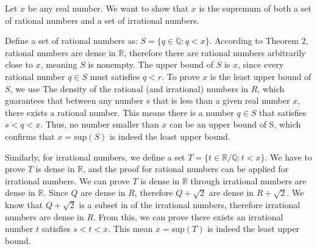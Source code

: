Let $x$ be any real number. We want to show that $x$ is the supremum of both a set of rational numbers and a set of irrational numbers.

Define a set of rational numbers as: $S=\{q \in \mathbb{Q}: q < x\}$. According to Theorem 2, rational numbers are dense in $\mathbb{R}$, therefore there are rational numbers arbitrarily close to $x$, meaning $S$ is nonempty. The upper bound of $S$ is $x$, since every rational number $q \in S$ must satisfies $q < r$. To prove $x$ is the least upper bound of $S$, we use The density of the rational (and irrational) numbers in $R$, which guarantees that between any number $s$ that is less than a given real number $x$, there exists a rational number. This means there is a number $q \in S$ that satisfies $s < q < x$. Thus, no number smaller than $x$ can be an upper bound of S, which confirms that $x = \text{sup}(S)$ is indeed the least upper bound.

Similarly, for irrational numbers, we define a set $T = \{t \in \mathbb{R} / \mathbb{Q} : t < x\}$. We have to prove $T$ is dense in $\mathbb{R}$, and the proof for rational numbers can be applied for irrational numbers. We can prove $T$ is dense in $\mathbb{R}$ through irrational numbers are dense in $\mathbb{R}$. Since $Q$ are dense in $R$, therefore $Q + \sqrt{2}$ are dense in $R + \sqrt{2}$. We know that $Q + \sqrt{2}$ is a subset in of the irrational numbers, therefore irrational numbers are dense in $R$. From this, we can prove there exists an irrational number $t$ satisfies $s < t < x$. This mean $x = \text{sup}(T)$ is indeed the least upper bound.

